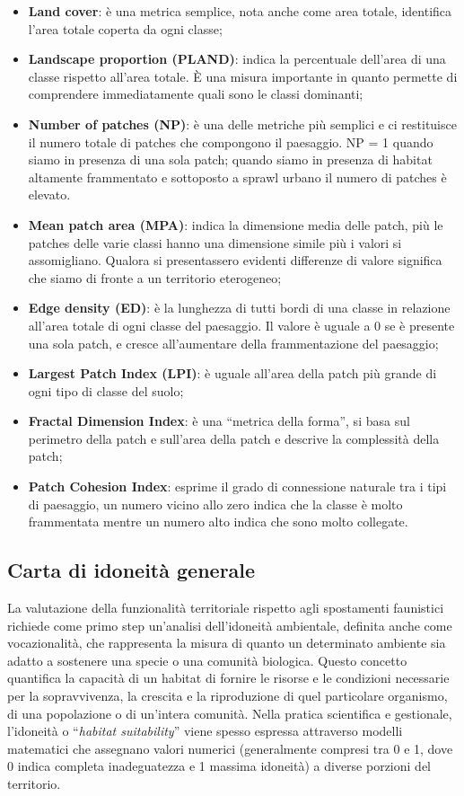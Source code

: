 \documentclass[
]{book}
\providecommand{\tightlist}{%
  \setlength{\itemsep}{0pt}\setlength{\parskip}{0pt}}
\begin{document}
\begin{itemize}
\tightlist
\item
  \textbf{Land cover}: è una metrica semplice, nota anche come area totale, identifica l'area totale coperta da ogni classe;
\item
  \textbf{Landscape proportion (PLAND)}: indica la percentuale dell'area di una classe rispetto all'area totale. È una misura importante in quanto permette di comprendere immediatamente quali sono le classi dominanti;
\item
  \textbf{Number of patches (NP)}: è una delle metriche più semplici e ci restituisce il numero totale di patches che compongono il paesaggio. NP = 1 quando siamo in presenza di una sola patch; quando siamo in presenza di habitat altamente frammentato e sottoposto a sprawl urbano il numero di patches è elevato.
\item
  \textbf{Mean patch area (MPA)}: indica la dimensione media delle patch, più le patches delle varie classi hanno una dimensione simile più i valori si assomigliano. Qualora si presentassero evidenti differenze di valore significa che siamo di fronte a un territorio eterogeneo;
\item
  \textbf{Edge density (ED)}: è la lunghezza di tutti bordi di una classe in relazione all'area totale di ogni classe del paesaggio. Il valore è uguale a 0 se è presente una sola patch, e cresce all'aumentare della frammentazione del paesaggio;
\item
  \textbf{Largest Patch Index (LPI)}: è uguale all'area della patch più grande di ogni tipo di classe del suolo;
\item
  \textbf{Fractal Dimension Index}: è una ``metrica della forma'', si basa sul perimetro della patch e sull'area della patch e descrive la complessità della patch;
\item
  \textbf{Patch Cohesion Index}: esprime il grado di connessione naturale tra i tipi di paesaggio, un numero vicino allo zero indica che la classe è molto frammentata mentre un numero alto indica che sono molto collegate.
\end{itemize}

\subsection{Carta di idoneità generale}\label{carta-di-idoneituxe0-generale}

La valutazione della funzionalità territoriale rispetto agli spostamenti faunistici richiede come primo step un'analisi dell'idoneità ambientale, definita anche come vocazionalità, che rappresenta la misura di quanto un determinato ambiente sia adatto a sostenere una specie o una comunità biologica.
Questo concetto quantifica la capacità di un habitat di fornire le risorse e le condizioni necessarie per la sopravvivenza, la crescita e la riproduzione di quel particolare organismo, di una popolazione o di un'intera comunità.
Nella pratica scientifica e gestionale, l'idoneità o ``\emph{habitat suitability}'' viene spesso espressa attraverso modelli matematici che assegnano valori numerici (generalmente compresi tra 0 e 1, dove 0 indica completa inadeguatezza e 1 massima idoneità) a diverse porzioni del territorio.
\end{document}
